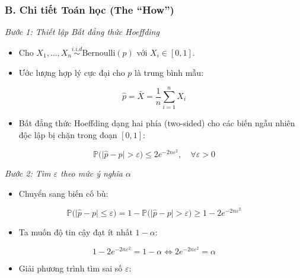 \documentclass[12pt,a4paper]{article}
\begin{document}
\subsubsection{B. Chi tiết Toán học (The ``How'')}\label{b.-chi-tiux1ebft-touxe1n-hux1ecdc-the-how-1}

\emph{Bước 1: Thiết lập Bất đẳng thức Hoeffding}

\begin{itemize}

\item
  Cho \(X_1, \dots, X_n \overset{i.i.d}{\sim} \text{Bernoulli}(p)\) với \(X_i \in [0, 1]\).
\item
  Ước lượng hợp lý cực đại cho \(p\) là trung bình mẫu:
\end{itemize}

\[\widehat{p} = \bar{X} = \frac{1}{n} \sum_{i=1}^n X_i\]

\begin{itemize}

\item
  Bất đẳng thức Hoeffding dạng hai phía (two-sided) cho các biến ngẫu nhiên độc lập bị chặn trong đoạn \([0, 1]\):
\end{itemize}

\[\mathbb{P}\big(\vert{}\widehat{p} - p\vert{} > \varepsilon\big) \le 2e^{-2n\varepsilon^2}, \quad \forall \varepsilon > 0\]

\emph{Bước 2: Tìm \(\varepsilon\) theo mức ý nghĩa \(\alpha\)}

\begin{itemize}

\item
  Chuyển sang biến cố bù:
\end{itemize}

\[\mathbb{P}\big(\vert{}\widehat{p} - p\vert{} \le \varepsilon\big) = 1 - \mathbb{P}\big(\vert{}\widehat{p} - p\vert{} > \varepsilon\big) \ge 1 - 2e^{-2n\varepsilon^2}\]

\begin{itemize}

\item
  Ta muốn độ tin cậy đạt ít nhất \(1 - \alpha\):
\end{itemize}

\[1 - 2e^{-2n\varepsilon^2} = 1 - \alpha \iff 2e^{-2n\varepsilon^2} = \alpha\]

\begin{itemize}

\item
  Giải phương trình tìm sai số \(\varepsilon\):
\end{itemize}
\end{document}
